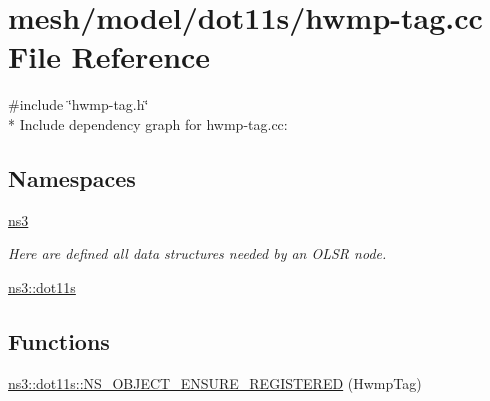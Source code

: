 \hypertarget{hwmp-tag_8cc}{}\section{mesh/model/dot11s/hwmp-\/tag.cc File Reference}
\label{hwmp-tag_8cc}
{\ttfamily \#include \char`\"{}hwmp-\/tag.\+h\char`\"{}}\\*
Include dependency graph for hwmp-\/tag.cc\+:
\subsection*{Namespaces}
\begin{DoxyCompactItemize}
\item 
 \hyperlink{namespacens3}{ns3}
\begin{DoxyCompactList}\small\item\em Here are defined all data structures needed by an O\+L\+SR node. \end{DoxyCompactList}\item 
 \hyperlink{namespacens3_1_1dot11s}{ns3\+::dot11s}
\end{DoxyCompactItemize}
\subsection*{Functions}
\begin{DoxyCompactItemize}
\item 
\hyperlink{namespacens3_1_1dot11s_a46ecc8b4b3f81cd5f673c3ad2b1f3da1}{ns3\+::dot11s\+::\+N\+S\+\_\+\+O\+B\+J\+E\+C\+T\+\_\+\+E\+N\+S\+U\+R\+E\+\_\+\+R\+E\+G\+I\+S\+T\+E\+R\+ED} (Hwmp\+Tag)
\end{DoxyCompactItemize}

